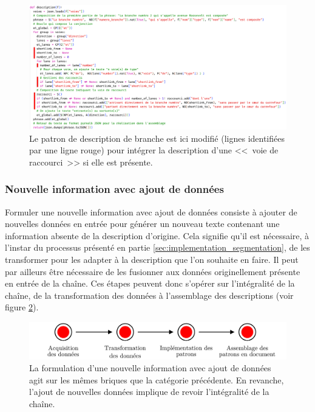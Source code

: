 \begin{itemize}
    \begin{figure}[H]
        \centering
        \includegraphics[width=\textwidth]{images/evaluation/pipeline/nouvelle_info.png}
        \caption[Patron modifié pour intégrer les <<~voies de raccourci~>>]{Le patron de description de branche est ici modifié (lignes identifiées par une ligne rouge) pour intégrer la description d'une <<~voie de raccourci~>> si elle est présente.}
        \label{fig:evaluation_patron_voie_de_raccourci}
    \end{figure}
\end{itemize}

\newpage

\subsubsection{Nouvelle information avec ajout de données}

Formuler une nouvelle information avec ajout de données consiste à ajouter de nouvelles données en entrée pour générer un nouveau texte contenant une information absente de la description d'origine. Cela signifie qu'il est nécessaire, à l'instar du processus présenté en partie \ref{sec:implementation_segmentation}, de les transformer pour les adapter à la description que l'on souhaite en faire. Il peut par ailleurs être nécessaire de les fusionner aux données originellement présente en entrée de la chaîne. Ces étapes peuvent  donc s'opérer sur l'intégralité de la chaîne, de la transformation des données à l'assemblage des descriptions (voir figure \ref{fig:evaluation_nouvelle_information_avec_ajout}).

\begin{figure}[ht]
    \centering
    \includegraphics[width=\textwidth]{images/evaluation/pipeline/pipeline_ajout_donnees.pdf}
    \caption[Formulation d'une nouvelle information avec ajout de donnée dans la chaîne de description]{La formulation d'une nouvelle information avec ajout de données agit sur les mêmes briques que la catégorie précédente. En revanche, l'ajout de nouvelles données implique de revoir l'intégralité de la chaîne.}
    \label{fig:evaluation_nouvelle_information_avec_ajout}
\end{figure}

